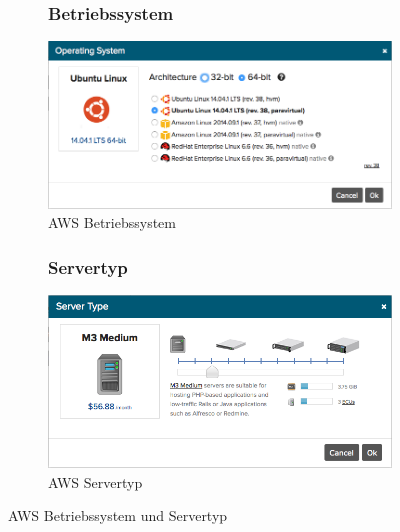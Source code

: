 \begin{figure}[!htbp]
  \centering
\begin{subfigure}[b]{.49\textwidth}
\subsubsection{Betriebssystem}
\includegraphics[width=\textwidth]{./03_Analyse/03_Bitnami/images/aws_operating_system}
\caption{AWS Betriebssystem}
\end{subfigure}
  \hfill
\begin{subfigure}[b]{.49\textwidth}
\subsubsection{Servertyp}
\includegraphics[width=\textwidth]{./03_Analyse/03_Bitnami/images/aws_servertype}
\caption{AWS Servertyp}
\end{subfigure}
\caption{AWS Betriebssystem und Servertyp}
\end{figure}

